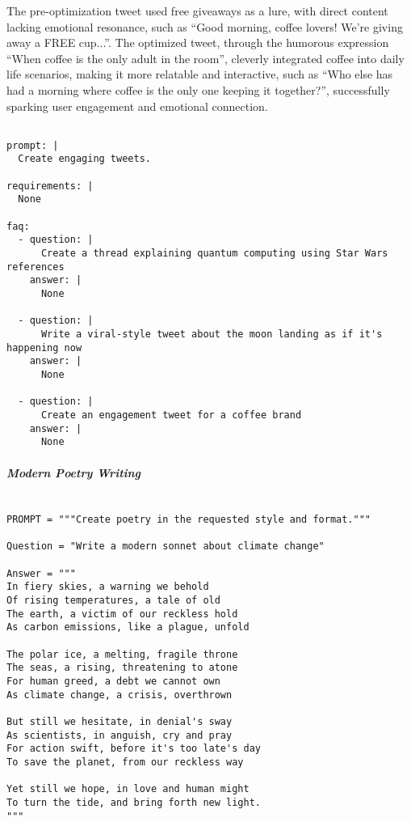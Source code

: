 The pre-optimization tweet used free giveaways as a lure, with direct content lacking emotional resonance, such as ``Good morning, coffee lovers! We're giving away a FREE cup...''. The optimized tweet, through the humorous expression ``When coffee is the only adult in the room'', cleverly integrated coffee into daily life scenarios, making it more relatable and interactive, such as ``Who else has had a morning where coffee is the only one keeping it together?'', successfully sparking user engagement and emotional connection.

\begin{tcolorbox}[title={\textbf{\small Iteration template on the BBH-navigate dataset}}, boxrule=2pt, arc=0mm, breakable]\begin{verbatim}

prompt: |
  Create engaging tweets.

requirements: |
  None

faq:
  - question: |
      Create a thread explaining quantum computing using Star Wars references
    answer: |
      None

  - question: |
      Write a viral-style tweet about the moon landing as if it's happening now
    answer: |
      None

  - question: |
      Create an engagement tweet for a coffee brand
    answer: |
      None

\end{verbatim}
\end{tcolorbox}

\subparagraph{Modern Poetry Writing} \mbox{} 

\begin{tcolorbox}[title={\textbf{\small Performance Before Optimization}}, boxrule=2pt, arc=0mm, breakable]
\begin{verbatim}

PROMPT = """Create poetry in the requested style and format."""

Question = "Write a modern sonnet about climate change"

Answer = """
In fiery skies, a warning we behold
Of rising temperatures, a tale of old
The earth, a victim of our reckless hold
As carbon emissions, like a plague, unfold

The polar ice, a melting, fragile throne
The seas, a rising, threatening to atone
For human greed, a debt we cannot own
As climate change, a crisis, overthrown

But still we hesitate, in denial's sway
As scientists, in anguish, cry and pray
For action swift, before it's too late's day
To save the planet, from our reckless way

Yet still we hope, in love and human might
To turn the tide, and bring forth new light.
"""


\end{verbatim}
\end{tcolorbox}

